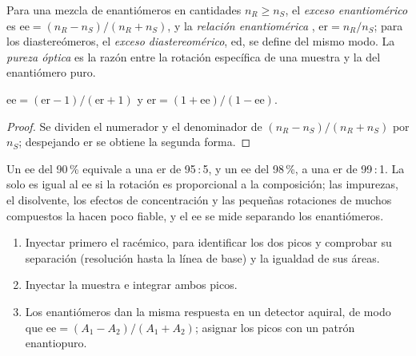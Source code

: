 \begin{definition}\label{def:b3:asymmetric-synthesis:ee}
Para una mezcla de enantiómeros en cantidades $n_R \ge n_S$, el \emph{exceso
enantiomérico} es $\mathrm{ee} = (n_R - n_S)/(n_R + n_S)$, y la \emph{relación enantiomérica}%
, $\mathrm{er} = n_R/n_S$; para los diastereómeros, el
\emph{exceso diastereomérico}, ed, se define del
mismo modo. La \emph{pureza óptica} es la razón entre la
rotación específica de una muestra y la del enantiómero puro.
\end{definition}

\begin{proposition}[ee y er]\label{prop:b3:asymmetric-synthesis:ee-er}
$\mathrm{ee} = (\mathrm{er} - 1)/(\mathrm{er} + 1)$ y $\mathrm{er} = (1 + \mathrm{ee})/(1 - \mathrm{ee})$.
\end{proposition}

\begin{proof}
Se dividen el numerador y el denominador de $(n_R - n_S)/(n_R + n_S)$ por $n_S$; despejando er se obtiene la
segunda forma.
\end{proof}

Un ee del 90\,\% equivale a una er de 95\,:\,5, y un ee del 98\,\%, a una er de 99\,:\,1. La 
solo es igual al ee si la rotación es proporcional a la composición; las impurezas, el
disolvente, los efectos de concentración y las pequeñas rotaciones de muchos compuestos la hacen
poco fiable, y el ee se mide separando los enantiómeros.

\begin{method}\label{met:b3:asymmetric-synthesis:ee-chromatogram}
\begin{enumerate}
  \item Inyectar primero el racémico, para identificar los dos picos y comprobar su
        separación (resolución hasta la línea de base) y la igualdad de sus áreas.
  \item Inyectar la muestra e integrar ambos picos.
  \item Los enantiómeros dan la misma respuesta en un detector aquiral, de modo que
        $\mathrm{ee} = (A_1 - A_2)/(A_1 + A_2)$; asignar los picos con un patrón enantiopuro.
\end{enumerate}
\end{method}

